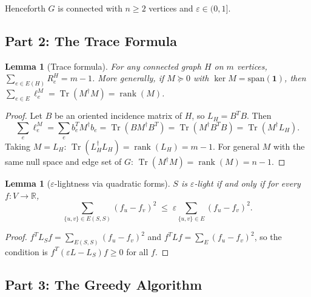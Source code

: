 \documentclass[12pt]{article}
\newtheorem{lemma}[theorem]{Lemma}
\begin{document}
Henceforth $G$ is connected with $n\geq 2$ vertices and $\varepsilon\in(0,1]$.

\subsection*{Part 2: The Trace Formula}

\begin{lemma}[Trace formula]\label{lem:trace}
For any connected graph $H$ on $m$ vertices,
$\displaystyle\sum_{e\in E(H)} R_e^H = m-1$.
More generally, if $M\succeq 0$ with $\ker M = \mathrm{span}(\mathbf{1})$, then
$\displaystyle\sum_{e\in E} \ell_e^M = \operatorname{Tr}(M^\dagger M) = \operatorname{rank}(M)$.
\end{lemma}
\begin{proof}
Let $B$ be an oriented incidence matrix of $H$, so $L_H = B^T B$.  Then
\[
  \sum_{e} \ell_e^M
  = \sum_e b_e^T M^\dagger b_e
  = \operatorname{Tr}(B M^\dagger B^T)
  = \operatorname{Tr}(M^\dagger B^T B)
  = \operatorname{Tr}(M^\dagger L_H).
\]
Taking $M = L_H$: $\operatorname{Tr}(L_H^\dagger L_H) = \operatorname{rank}(L_H) = m-1$.
For general $M$ with the same null space and edge set of $G$:
$\operatorname{Tr}(M^\dagger M) = \operatorname{rank}(M) = n-1$.
\end{proof}

\begin{lemma}[$\varepsilon$-lightness via quadratic forms]\label{lem:qf}
$S$ is $\varepsilon$-light if and only if for every $f:V\to\mathbb{R}$,
\[
  \sum_{\{u,v\}\in E(S,S)}(f_u-f_v)^2
  \;\leq\;
  \varepsilon\sum_{\{u,v\}\in E}(f_u-f_v)^2.
\]
\end{lemma}
\begin{proof}
$f^T L_S f = \sum_{E(S,S)}(f_u-f_v)^2$ and $f^T L f = \sum_E(f_u-f_v)^2$,
so the condition is $f^T(\varepsilon L-L_S)f\geq 0$ for all $f$.
\end{proof}

\subsection*{Part 3: The Greedy Algorithm}
\end{document}
